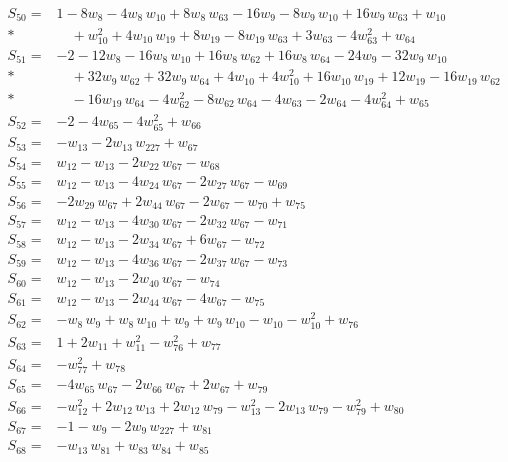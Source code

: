 \documentclass[11pt]{article}
\theoremstyle{remark}\newtheorem{remark}[theorem]{Remark}
\begin{document}
\begin{align*}
S_{50}={}& 1 - 8w_{8} - 4w_{8}\,w_{10} + 8w_{8}\,w_{63} - 16w_{9} - 8w_{9}\,w_{10} + 16w_{9}\,w_{63} + w_{10} \\*
&\quad  + w_{10}^{2} + 4w_{10}\,w_{19} + 8w_{19} - 8w_{19}\,w_{63} + 3w_{63} - 4w_{63}^{2} + w_{64} \\[2pt]
S_{51}={}& -2 - 12w_{8} - 16w_{8}\,w_{10} + 16w_{8}\,w_{62} + 16w_{8}\,w_{64} - 24w_{9} - 32w_{9}\,w_{10} \\*
&\quad  + 32w_{9}\,w_{62} + 32w_{9}\,w_{64} + 4w_{10} + 4w_{10}^{2} + 16w_{10}\,w_{19} + 12w_{19} - 16w_{19}\,w_{62} \\*
&\quad  - 16w_{19}\,w_{64} - 4w_{62}^{2} - 8w_{62}\,w_{64} - 4w_{63} - 2w_{64} - 4w_{64}^{2} + w_{65} \\[2pt]
S_{52}={}& -2 - 4w_{65} - 4w_{65}^{2} + w_{66} \\[2pt]
S_{53}={}& -w_{13} - 2w_{13}\,w_{227} + w_{67} \\[2pt]
S_{54}={}& w_{12} - w_{13} - 2w_{22}\,w_{67} - w_{68} \\[2pt]
S_{55}={}& w_{12} - w_{13} - 4w_{24}\,w_{67} - 2w_{27}\,w_{67} - w_{69} \\[2pt]
S_{56}={}& -2w_{29}\,w_{67} + 2w_{44}\,w_{67} - 2w_{67} - w_{70} + w_{75} \\[2pt]
S_{57}={}& w_{12} - w_{13} - 4w_{30}\,w_{67} - 2w_{32}\,w_{67} - w_{71} \\[2pt]
S_{58}={}& w_{12} - w_{13} - 2w_{34}\,w_{67} + 6w_{67} - w_{72} \\[2pt]
S_{59}={}& w_{12} - w_{13} - 4w_{36}\,w_{67} - 2w_{37}\,w_{67} - w_{73} \\[2pt]
S_{60}={}& w_{12} - w_{13} - 2w_{40}\,w_{67} - w_{74} \\[2pt]
S_{61}={}& w_{12} - w_{13} - 2w_{44}\,w_{67} - 4w_{67} - w_{75} \\[2pt]
S_{62}={}& -w_{8}\,w_{9} + w_{8}\,w_{10} + w_{9} + w_{9}\,w_{10} - w_{10} - w_{10}^{2} + w_{76} \\[2pt]
S_{63}={}& 1 + 2w_{11} + w_{11}^{2} - w_{76}^{2} + w_{77} \\[2pt]
S_{64}={}& -w_{77}^{2} + w_{78} \\[2pt]
S_{65}={}& -4w_{65}\,w_{67} - 2w_{66}\,w_{67} + 2w_{67} + w_{79} \\[2pt]
S_{66}={}& -w_{12}^{2} + 2w_{12}\,w_{13} + 2w_{12}\,w_{79} - w_{13}^{2} - 2w_{13}\,w_{79} - w_{79}^{2} + w_{80} \\[2pt]
S_{67}={}& -1 - w_{9} - 2w_{9}\,w_{227} + w_{81} \\[2pt]
S_{68}={}& -w_{13}\,w_{81} + w_{83}\,w_{84} + w_{85} \\[2pt]

\end{align*}
\end{document}
